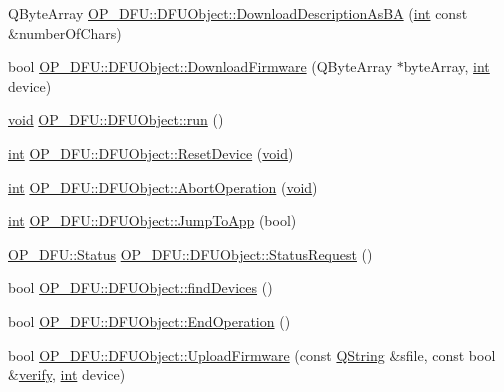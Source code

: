 \begin{DoxyCompactItemize}
\item 
Q\-Byte\-Array \hyperlink{group___uploader_gaa0f76d47015fa313a0bcf555bb0e690b}{O\-P\-\_\-\-D\-F\-U\-::\-D\-F\-U\-Object\-::\-Download\-Description\-As\-B\-A} (\hyperlink{ioapi_8h_a787fa3cf048117ba7123753c1e74fcd6}{int} const \&number\-Of\-Chars)
\item 
bool \hyperlink{group___uploader_ga8b88c71b81cbe00fe29938ac9b8a6dcf}{O\-P\-\_\-\-D\-F\-U\-::\-D\-F\-U\-Object\-::\-Download\-Firmware} (Q\-Byte\-Array $\ast$byte\-Array, \hyperlink{ioapi_8h_a787fa3cf048117ba7123753c1e74fcd6}{int} device)
\item 
\hyperlink{group___u_a_v_objects_plugin_ga444cf2ff3f0ecbe028adce838d373f5c}{void} \hyperlink{group___uploader_gadb19927303aa24b5505dce3adbb532a2}{O\-P\-\_\-\-D\-F\-U\-::\-D\-F\-U\-Object\-::run} ()
\item 
\hyperlink{ioapi_8h_a787fa3cf048117ba7123753c1e74fcd6}{int} \hyperlink{group___uploader_gafbdc3dede843764690ebd5bc074ff5dd}{O\-P\-\_\-\-D\-F\-U\-::\-D\-F\-U\-Object\-::\-Reset\-Device} (\hyperlink{group___u_a_v_objects_plugin_ga444cf2ff3f0ecbe028adce838d373f5c}{void})
\item 
\hyperlink{ioapi_8h_a787fa3cf048117ba7123753c1e74fcd6}{int} \hyperlink{group___uploader_gaa448917a297dd634c2ab4d760a6c402d}{O\-P\-\_\-\-D\-F\-U\-::\-D\-F\-U\-Object\-::\-Abort\-Operation} (\hyperlink{group___u_a_v_objects_plugin_ga444cf2ff3f0ecbe028adce838d373f5c}{void})
\item 
\hyperlink{ioapi_8h_a787fa3cf048117ba7123753c1e74fcd6}{int} \hyperlink{group___uploader_gad6165621f503c5767306199a8606edaf}{O\-P\-\_\-\-D\-F\-U\-::\-D\-F\-U\-Object\-::\-Jump\-To\-App} (bool)
\item 
\hyperlink{class_o_p___d_f_u_a83b075feaf572fe76e597acea58c8eda}{O\-P\-\_\-\-D\-F\-U\-::\-Status} \hyperlink{group___uploader_gadd798371bcb5c155ef215f5a77316471}{O\-P\-\_\-\-D\-F\-U\-::\-D\-F\-U\-Object\-::\-Status\-Request} ()
\item 
bool \hyperlink{group___uploader_ga09f55b9de769e32ad728223294a8a500}{O\-P\-\_\-\-D\-F\-U\-::\-D\-F\-U\-Object\-::find\-Devices} ()
\item 
bool \hyperlink{group___uploader_ga16f60a8d921f01aca803178398ccdf45}{O\-P\-\_\-\-D\-F\-U\-::\-D\-F\-U\-Object\-::\-End\-Operation} ()
\item 
bool \hyperlink{group___uploader_gacccdb64a8aa1c8ff0f90296fcb935fef}{O\-P\-\_\-\-D\-F\-U\-::\-D\-F\-U\-Object\-::\-Upload\-Firmware} (const \hyperlink{group___u_a_v_objects_plugin_gab9d252f49c333c94a72f97ce3105a32d}{Q\-String} \&sfile, const bool \&\hyperlink{analyze_raw_8m_a1835448b913ced5d93c9665a7a62b20d}{verify}, \hyperlink{ioapi_8h_a787fa3cf048117ba7123753c1e74fcd6}{int} device)

\end{DoxyCompactItemize}
